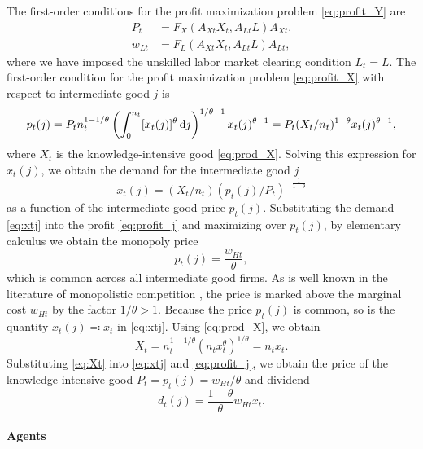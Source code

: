 \documentclass[a4paper,12pt]{article}
\numberwithin{equation}{section}
\theoremstyle{plain}
\begin{document}
The first-order conditions for the profit maximization problem \eqref{eq:profit_Y} are
\begin{subequations}
\begin{align}
    P_t&=F_X(A_{Xt}X_t,A_{Lt}L)A_{Xt}. \label{eq:Pt} \\
    w_{Lt}&=F_L(A_{Xt}X_t,A_{Lt}L)A_{Lt}, \label{eq:wLt}
\end{align}
\end{subequations}
where we have imposed the unskilled labor market clearing condition $L_t=L$. The first-order condition for the profit maximization problem \eqref{eq:profit_X} with respect to intermediate good $j$ is
\begin{equation*}
    p_t(j)=P_tn_t^{1-1/\theta}\left( \int_0^{n_t} [x_t(j)]^\theta \mathop{}\!\mathrm{d} j\right)^{1/\theta-1}x_t(j)^{\theta-1}=P_t(X_t/n_t)^{1-\theta}x_t(j)^{\theta-1},
\end{equation*}
where $X_t$ is the knowledge-intensive good \eqref{eq:prod_X}. Solving this expression for $x_t(j)$, we obtain the demand for the intermediate good $j$
\begin{equation}
    x_t(j)=(X_t/n_t)(p_t(j)/P_t)^{-\frac{1}{1-\theta}} \label{eq:xtj}
\end{equation}
as a function of the intermediate good price $p_t(j)$. Substituting the demand \eqref{eq:xtj} into the profit \eqref{eq:profit_j} and maximizing over $p_t(j)$, by elementary calculus we obtain the monopoly price
\begin{equation}
    p_t(j)=\frac{w_{Ht}}{\theta}, \label{eq:ptj}
\end{equation}
which is common across all intermediate good firms. As is well known in the literature of monopolistic competition \citep{DixitStiglitz1977}, the price is marked above the marginal cost $w_{Ht}$ by the factor $1/\theta>1$. Because the price $p_t(j)$ is common, so is the quantity $x_t(j)\eqqcolon x_t$ in \eqref{eq:xtj}. Using \eqref{eq:prod_X}, we obtain
\begin{equation}
    X_t=n_t^{1-1/\theta}(n_tx_t^\theta)^{1/\theta}=n_tx_t. \label{eq:Xt}
\end{equation}
Substituting \eqref{eq:Xt} into \eqref{eq:xtj} and \eqref{eq:profit_j}, we obtain the price of the knowledge-intensive good $P_t=p_t(j)=w_{Ht}/\theta$ and dividend
\begin{equation}
    d_t(j)=\frac{1-\theta}{\theta}w_{Ht}x_t. \label{eq:dtj}
\end{equation}

\paragraph{Agents}
\end{document}
